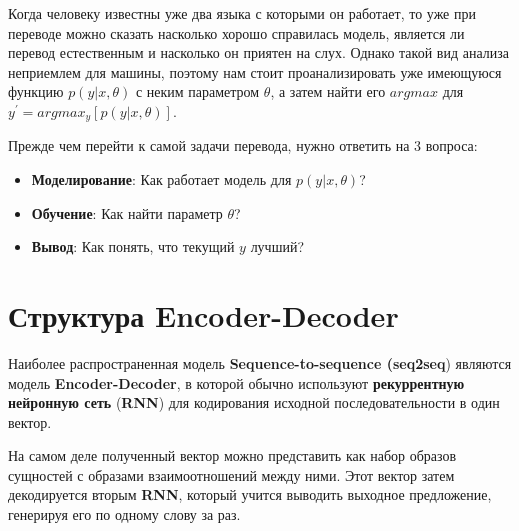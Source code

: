 \documentclass[a4paper,russian]{article}
\begin{document}
	Когда человеку известны уже два языка с которыми он работает, то уже при переводе можно сказать насколько хорошо справилась модель, является ли перевод естественным и насколько он приятен на слух. Однако такой вид анализа неприемлем для машины, поэтому нам стоит проанализировать уже имеющуюся функцию $p(y|x,\theta)$ с неким параметром $\theta$, а затем найти его $argmax$ для $y^{'} = argmax_{y}[p(y|x, \theta)]$.
	
	Прежде чем перейти к самой задачи перевода, нужно ответить на 3 вопроса:
	
	\begin{itemize}
		\item \textbf{Моделирование}: Как работает модель для $p(y|x, \theta)$?
		\item \textbf{Обучение}: Как найти параметр $\theta$?
		\item \textbf{Вывод}: Как понять, что текущий $y$ лучший?
	\end{itemize}
	
	\clearpage
	
	\section{Структура Encoder-Decoder}
	
	Наиболее распространенная модель \textbf{Sequence-to-sequence (seq2seq}) являются модель \textbf{Encoder-Decoder}, в которой обычно используют \textbf{рекуррентную нейронную сеть} (\textbf{RNN}) для кодирования исходной последовательности в один вектор.
	
	На самом деле полученный вектор можно представить как набор образов сущностей с образами взаимоотношений между ними. Этот вектор затем декодируется вторым \textbf{RNN}, который учится выводить выходное предложение, генерируя его по одному слову за раз.
	
\end{document}
